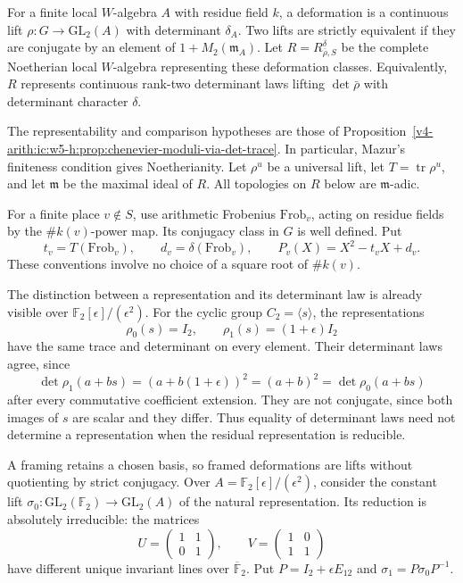 For a finite local $W$-algebra $A$ with residue field $k$, a deformation
is a continuous lift $\rho:G\to\mathrm{GL}_2(A)$ with determinant
$\delta_A$. Two lifts are strictly equivalent if they are conjugate
by an element of $1+M_2(\mathfrak m_A)$.
Let $R=R^{\delta}_{\bar\rho,S}$ be the complete Noetherian local
$W$-algebra representing these deformation classes. Equivalently,
$R$ represents continuous rank-two determinant laws lifting
$\det\bar\rho$ with determinant character $\delta$.

The representability and comparison hypotheses are those of
Proposition~\ref{v4-arith:ic:w5-h:prop:chenevier-moduli-via-det-trace}.
In particular, Mazur's finiteness condition gives Noetherianity.
Let $\rho^u$ be a universal lift, let $T=\operatorname{tr}\rho^u$,
and let $\mathfrak m$ be the maximal ideal of $R$.
All topologies on $R$ below are $\mathfrak m$-adic.

For a finite place $v\notin S$, use arithmetic Frobenius
$\mathrm{Frob}_v$, acting on residue fields by the $\#k(v)$-power map.
Its conjugacy class in $G$ is well defined. Put
\[
 t_v=T(\mathrm{Frob}_v),\qquad
 d_v=\delta(\mathrm{Frob}_v),\qquad
 P_v(X)=X^2-t_vX+d_v.
\]
These conventions involve no choice of a square root of $\#k(v)$.

The distinction between a representation and its determinant law is
already visible over $\mathbb F_2[\epsilon]/(\epsilon^2)$. For the cyclic group
$C_2=\langle s\rangle$, the representations
\[
 \rho_0(s)=I_2,\qquad \rho_1(s)=(1+\epsilon)I_2
\]
have the same trace and determinant on every element. Their determinant
laws agree, since
\[
 \det\rho_1(a+bs)=(a+b(1+\epsilon))^2=(a+b)^2
 =\det\rho_0(a+bs)
\]
after every commutative coefficient extension. They are not conjugate,
since both images of $s$ are scalar and they differ. Thus equality of
determinant laws need not determine a representation when the residual
representation is reducible.

A framing retains a chosen basis, so framed deformations are lifts
without quotienting by strict conjugacy. Over
$A=\mathbb F_2[\epsilon]/(\epsilon^2)$, consider the constant lift
$\sigma_0:\mathrm{GL}_2(\mathbb F_2)\to\mathrm{GL}_2(A)$ of the
natural representation. Its reduction is absolutely irreducible:
the matrices
\[
 U=\begin{pmatrix}1&1\\0&1\end{pmatrix},\qquad
 V=\begin{pmatrix}1&0\\1&1\end{pmatrix}
\]
have different unique invariant lines over $\overline{\mathbb F}_2$.
Put $P=I_2+\epsilon E_{12}$ and $\sigma_1=P\sigma_0P^{-1}$.

